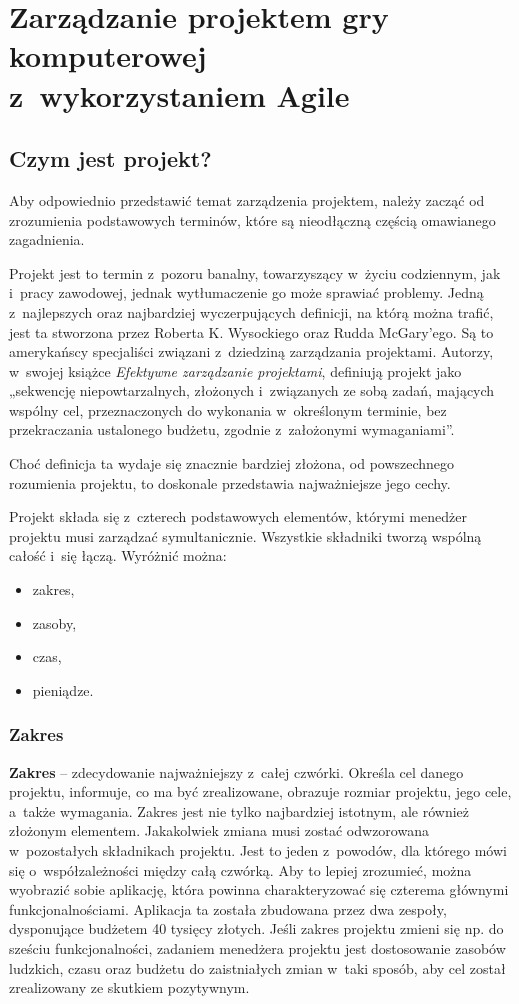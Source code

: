 \documentclass[oneside,polski,logo]{amuthesis}
\begin{document}
\chapter{Zarządzanie projektem gry komputerowej \\ z~wykorzystaniem Agile}
\section{Czym jest projekt?}
Aby odpowiednio przedstawić temat zarządzenia projektem, należy zacząć od zrozumienia podstawowych terminów, które są nieodłączną częścią omawianego zagadnienia.

Projekt jest to termin z~pozoru banalny, towarzyszący w~życiu codziennym, jak i~pracy zawodowej, jednak wytłumaczenie go może sprawiać problemy. Jedną z~najlepszych oraz najbardziej wyczerpujących definicji, na którą można trafić, jest ta stworzona przez Roberta K. Wysockiego oraz Rudda McGary'ego. Są to amerykańscy specjaliści związani z~dziedziną zarządzania projektami. Autorzy, w~swojej książce \emph{Efektywne zarządzanie projektami}, definiują projekt jako „sekwencję niepowtarzalnych, złożonych i~związanych ze sobą zadań, mających wspólny cel, przeznaczonych do wykonania w~określonym terminie, bez przekraczania ustalonego budżetu, zgodnie z~założonymi wymaganiami”. \cite{projekt} 

Choć definicja ta wydaje się znacznie bardziej złożona, od powszechnego rozumienia projektu, to doskonale przedstawia najważniejsze jego cechy. \cite{projekt2} \cite{projekt3}

Projekt składa się z~czterech podstawowych elementów, którymi menedżer projektu musi zarządzać symultanicznie. Wszystkie składniki tworzą wspólną całość i~się łączą. Wyróżnić można:
\begin{itemize}
	\item zakres,
	\item zasoby,
	\item czas,
	\item pieniądze.
\end{itemize}

\subsection {Zakres}
\textbf{Zakres} – zdecydowanie najważniejszy z~całej czwórki. Określa cel danego projektu, informuje, co ma być zrealizowane, obrazuje rozmiar projektu, jego cele, a~także wymagania. Zakres jest nie tylko najbardziej istotnym, ale również złożonym elementem. Jakakolwiek zmiana musi zostać odwzorowana w~pozostałych składnikach projektu. Jest to jeden z~powodów, dla którego mówi się o~współzależności między całą czwórką. Aby to lepiej zrozumieć, można wyobrazić sobie aplikację, która powinna charakteryzować się czterema głównymi funkcjonalnościami. Aplikacja ta została zbudowana przez dwa zespoły, dysponujące budżetem 40 tysięcy złotych. Jeśli zakres projektu zmieni się np. do sześciu funkcjonalności, zadaniem menedżera projektu jest dostosowanie zasobów ludzkich, czasu oraz budżetu do zaistniałych zmian w~taki sposób, aby cel został zrealizowany ze skutkiem pozytywnym. \cite{zarzadzanie8}
\end{document}
